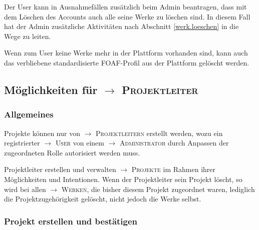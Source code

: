 \documentclass[a4paper,11pt]{article}
\newcommand{\glossar}[1]{{$\to$ \textsc{#1}}}
\begin{document}
Der User kann in Ausnahmefällen zusätzlich beim Admin beantragen, dass mit dem
Löschen des Accounts auch alle seine Werke zu löschen sind. In diesem Fall hat
der Admin zusätzliche Aktivitäten nach Abschnitt \ref{werk.loeschen} in die
Wege zu leiten.  

Wenn zum User keine Werke mehr in der Plattform vorhanden sind, kann auch das
verbliebene standardisierte FOAF-Profil aus der Plattform gelöscht werden.

\subsection{Möglichkeiten für \glossar{Projektleiter}}

\subsubsection{Allgemeines}
 
Projekte können nur von \glossar{Projektleitern} erstellt werden, wozu ein
registrierter \glossar{User} von einem \glossar{Administrator} durch Anpassen
der zugeordneten Rolle autorisiert werden muss.

Projektleiter erstellen und verwalten \glossar{Projekte} im Rahmen ihrer
Möglichkeiten und Intentionen. Wenn der Projektleiter sein Projekt löscht, so
wird bei allen \glossar{Werken}, die bisher diesem Projekt zugeordnet waren,
lediglich die Projektzugehörigkeit gelöscht, nicht jedoch die Werke selbst.

\subsubsection{Projekt erstellen und bestätigen}
\end{document}
